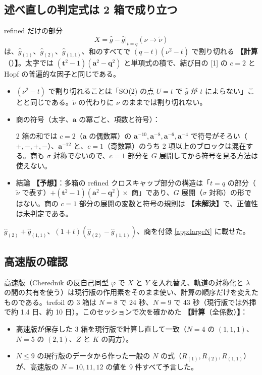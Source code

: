 \documentclass[a4paper,10pt]{ltjsarticle}
\newcommand{\ba}{\bm{a}}
\newcommand{\bq}{\bm{q}}
\newcommand{\bt}{\bm{t}}
\newcommand{\tnu}{\tilde\nu}
\newcommand{\comp}[1]{\textbf{【計算}\if\relax\detokenize{#1}\relax\else（#1）\fi\textbf{】}}
\newcommand{\conj}{\textbf{【予想】}}
\newcommand{\open}{\textbf{【未解決】}}
\begin{document}
\subsection{述べ直しの判定式は 2 箱で成り立つ}
refined だけの部分
\[
X = \hat g - \hat g\big|_{t = q}(\nu \to \tnu)
\]
は、$\hat g_{(1)}$、$\hat g_{(2)}$、$\hat g_{(1,1)}$、和のすべてで $(q - t)(\nu^2 - t)$ で割り切れる \comp{}。太字では $(\bt^2 - 1)(\ba^2 - \bq^2)$ と単項式の積で、結び目の [1] の $c = 2$ と Hopf の普遍的な因子と同じである。
\begin{itemize}
\item $(\nu^2 - t)$ で割り切れることは「SO(2) の点 $U = t$ で $\hat g$ が $t$ によらない」ことと同じである。$\tnu$ の代わりに $\nu$ のままでは割り切れない。
\item 商の符号（太字、$\ba$ の冪ごと、項数と符号）：

2 箱の和では $c = 2$（$\ba$ の偶数冪）の $\ba^{-10}, \ba^{-8}, \ba^{-6}, \ba^{-4}$ で符号がそろい（$+, -, +, -$）、$\ba^{-12}$ と、$c = 1$（奇数冪）のうち 2 項以上のブロックは混在する。商も $\sigma$ 対称でないので、$c = 1$ 部分を $G$ 展開してから符号を見る方法は使えない。
\item 結論 \conj：多箱の refined クロスキャップ部分の構造は「$t = q$ の部分（$\tnu$ で表す）$+ (\bt^2 - 1)(\ba^2 - \bq^2) \times$ 商」であり、$G$ 展開（$\sigma$ 対称）の形ではない。商の $c = 1$ 部分の展開の変数と符号の規則は \open で、正値性は未判定である。
\end{itemize}
$\hat g_{(2)} + \hat g_{(1,1)}$、$(1+t)(\hat g_{(2)} - \hat g_{(1,1)})$、商を付録 \ref{app:largeN} に載せた。

\subsection{高速版の確認}
高速版（Cherednik の反自己同型 $\varphi$ で $X$ と $Y$ を入れ替え、軌道の対称化と $\lambda$ の間の共有を使う）は現行版の作用素をそのまま使い、計算の順序だけを変えたものである。trefoil の 3 箱は $N = 8$ で 24 秒、$N = 9$ で 43 秒（現行版では外挿で約 1.4 日、約 10 日）。このセッションで次を確かめた \comp{全係数}：
\begin{itemize}
\item 高速版が保存した 3 箱を現行版で計算し直して一致（$N = 4$ の $(1,1,1)$、$N = 5$ の $(2,1)$、$Z$ と $K$ の両方）。
\item $N \le 9$ の現行版のデータから作った一般の $N$ の式（$R_{(1)}, R_{(2)}, R_{(1,1)}$）が、高速版の $N = 10, 11, 12$ の値を 9 件すべて予言した。
\end{itemize}
\end{document}
